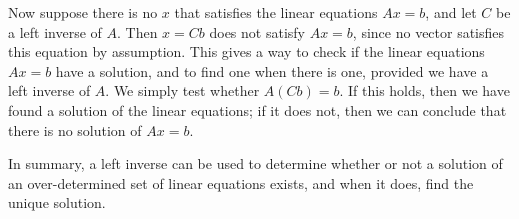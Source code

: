 Now suppose there is no \(x\) that satisfies the linear equations \(Ax=b\), and let \(C\) be a left inverse of \(A\). Then \(x=Cb\) does not satisfy \(Ax=b\), since no vector satisfies this equation by assumption. This gives a way to check if the linear equations \(Ax=b\) have a solution, and to find one when there is one, provided we have a left inverse of \(A\). We simply test whether \(A(Cb)=b\). If this holds, then we have found a solution of the linear equations; if it does not, then we can conclude that there is no solution of \(Ax=b\).

In summary, a left inverse can be used to determine whether or not a solution of an over-determined set of linear equations exists, and when it does, find the unique solution.

 
